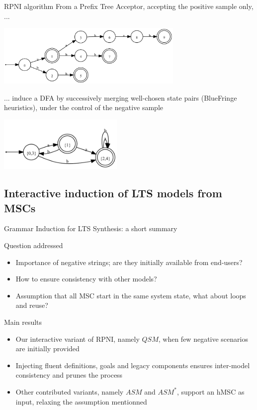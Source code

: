 
\begin{frame}{RPNI algorithm}
  From a Prefix Tree Acceptor, accepting the positive sample only, ...
  \begin{center}
	  \includegraphics[width=9cm]{images/dfa_merge_0.pdf}
  \end{center}
  ... induce a DFA by successively merging well-chosen state pairs (BlueFringe heuristics), under the control of the negative sample
  \begin{center}
	  \includegraphics[width=6cm]{images/dfa_merge_3.pdf}
  \end{center}
\end{frame}

\subsection{Interactive induction of LTS models from MSCs}

\begin{frame}{Grammar Induction for LTS Synthesis: a short summary}
	\begin{block}{Question addressed}
		\begin{itemize}
			\item Importance of negative strings; are they initially available from end-users?
			\item How to ensure consistency with other models?
			\item Assumption that all MSC start in the same system state, what about loops and reuse?
		\end{itemize}
	\end{block}
	\begin{block}{Main results}
		\begin{itemize}
			\item Our interactive variant of RPNI, namely $QSM$, when few negative scenarios are initially provided
			\item Injecting fluent definitions, goals and legacy components ensures inter-model consistency and prunes the process
			\item Other contributed variants, namely $ASM$ and $ASM^*$, support an hMSC as input, relaxing the assumption mentionned
		\end{itemize}
	\end{block}
\end{frame}

